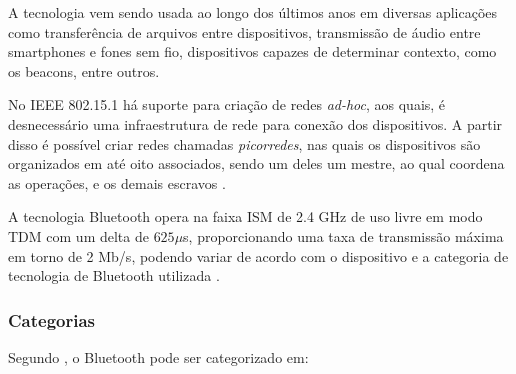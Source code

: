 A tecnologia vem sendo usada ao longo dos últimos anos em diversas aplicações como transferência de arquivos entre dispositivos, transmissão de áudio entre smartphones e fones sem fio, dispositivos capazes de determinar contexto, como os beacons, entre outros.

No IEEE 802.15.1 há suporte para criação de redes \textit{ad-hoc}, aos quais, é desnecessário uma infraestrutura de rede para conexão dos dispositivos. A partir disso é possível criar redes chamadas \textit{picorredes}, nas quais os dispositivos são organizados em até oito associados, sendo um deles um mestre, ao qual coordena as operações, e os demais escravos \cite{BluetoothSIG2017}.

A tecnologia Bluetooth opera na faixa ISM de 2.4 GHz de uso livre em modo TDM com um delta de $625\mu$s, proporcionando uma taxa de transmissão máxima em torno de 2 Mb/s, podendo variar de acordo com o dispositivo e a categoria de tecnologia de Bluetooth utilizada \cite{BluetoothSIG2017}.


\subsubsection{Categorias}

Segundo \citeauthor{BluetoothSIG2017}, o Bluetooth pode ser categorizado em:

